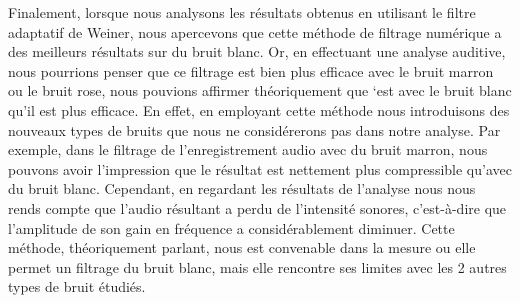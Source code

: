 \documentclass[conference,onecolumn]{IEEEtran}
\begin{document}
Finalement, lorsque nous analysons les résultats obtenus en utilisant le filtre adaptatif de Weiner, nous apercevons que cette méthode de filtrage numérique a des meilleurs résultats sur du bruit blanc. Or, en effectuant une analyse auditive, nous pourrions penser que ce filtrage est bien plus efficace avec le bruit marron ou le bruit rose, nous pouvions affirmer théoriquement que ‘est avec le bruit blanc qu’il est plus efficace. En effet, en employant cette méthode nous introduisons des nouveaux types de bruits que nous ne considérerons pas dans notre analyse. Par exemple, dans le filtrage de l’enregistrement audio avec du bruit marron, nous pouvons avoir l’impression que le résultat est nettement plus compressible qu’avec du bruit blanc. Cependant, en regardant les résultats de l’analyse nous nous rends compte que l’audio résultant a perdu de l’intensité sonores, c’est-à-dire que l’amplitude de son gain en fréquence a considérablement diminuer. Cette méthode, théoriquement parlant, nous est convenable dans la mesure ou elle permet un filtrage du bruit blanc, mais elle rencontre ses limites avec les 2 autres types de bruit étudiés.
\end{document}
